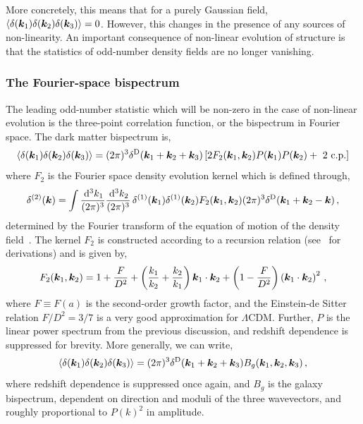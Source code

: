More concretely, this means that for a purely Gaussian field, $\langle \delta(\bm {k}_1) \delta(\bm {k}_2) \delta(\bm {k}_3)\rangle = 0$. However, this changes in the presence of any sources of non-linearity. An important consequence of non-linear evolution of structure is that the statistics of odd-number density fields are no longer vanishing. 

\subsubsection{The Fourier-space bispectrum}

The leading odd-number statistic which will be non-zero in the case of non-linear evolution is the three-point correlation function, or the bispectrum in Fourier space. The dark matter bispectrum is, 
\begin{equation}
	\langle \delta(\bm {k}_1) \delta(\bm {k}_2) \delta(\bm {k}_3) \rangle = (2 \pi )^3 \delta^\mathrm{D}(\bm {k}_1 + \bm {k}_2 + \bm {k}_3) \left[ 2 F_2(\bm {k}_1,\bm {k}_2) P(\bm {k}_1) P(\bm {k}_2) + \text{ 2 c.p.} \right]
\end{equation}
where $F_2$ is the Fourier space density evolution kernel which is defined through, 
\begin{equation}
	\delta^{(2)} (\bm {k}) = \int \frac{\,\mathrm{d}^3 k_1 }{(2 \pi)^3}\frac{\,\mathrm{d}^3 k_2}{(2\pi)^3}\, \delta^{(1)}(\bm {k}_1)\delta^{(1)}(\bm {k}_2) F_2(\bm {k}_1,\bm {k}_2) (2\pi)^3 \delta^\mathrm{D}(\bm {k}_1 + \bm {k}_2 - \bm {k})\,, 
\end{equation}
determined by the Fourier transform of the equation of motion of the density field~\cite{Bernardeau:2001qr}. The kernel $F_2$ is constructed according to a recursion relation (see~\cite{Goroff:1986ep,Jain:1993jh} for derivations) and is given by, 
\begin{equation}
	F_2(\bm {k}_1,\bm {k}_2) = 1 + \frac{F}{D^2} + \left( \frac{k_1}{k_2} + \frac{k_2}{k_1} \right) \bm {k}_1 \cdot \bm {k}_2 + \left( 1 - \frac{F}{D^2} \right) \left( \bm {k}_1 \cdot \bm {k}_2 \right)^2\,,	
\end{equation}
where $F \equiv F(a)$ is the second-order growth factor, and the Einstein-de Sitter relation $F/D^2 = 3/7$ is a very good approximation for $\Lambda$CDM. Further, $P$ is the linear power spectrum from the previous discussion, and redshift dependence is suppressed for brevity. More generally, we can write, 
\begin{equation}
	\langle \delta(\bm {k}_1) \delta(\bm {k}_2) \delta(\bm {k}_3) \rangle = (2 \pi )^3 \delta^\mathrm{D}(\bm {k}_1 + \bm {k}_2 + \bm {k}_3) B_g(\bm {k}_1,\bm {k}_2,\bm {k}_3)\,,
\end{equation}
where redshift dependence is suppressed once again, and $B_g$ is the galaxy bispectrum, dependent on direction and moduli of the three wavevectors, and roughly proportional to $P(k)^2$ in amplitude.

